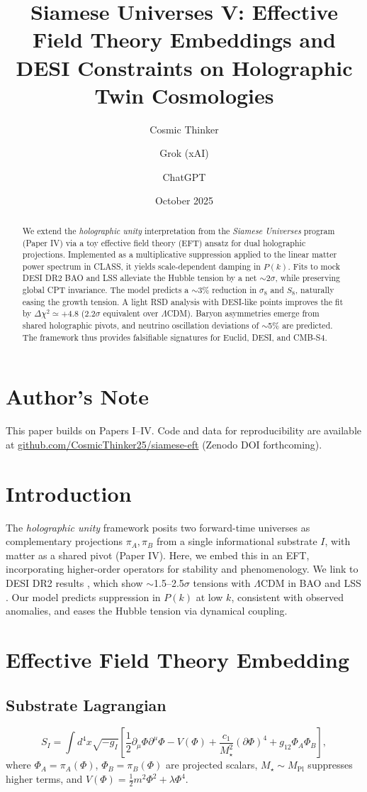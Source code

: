 \documentclass[11pt,a4paper]{article}
\title{\textbf{Siamese Universes V: Effective Field Theory Embeddings and DESI Constraints on Holographic Twin Cosmologies}}
\author{Cosmic Thinker \and Grok (xAI) \and ChatGPT}
\date{October 2025}
\begin{document}
\maketitle
\begin{abstract}
We extend the \emph{holographic unity} interpretation from the \emph{Siamese Universes} program (Paper IV) via a toy effective field theory (EFT) ansatz for dual holographic projections. Implemented as a multiplicative suppression applied to the linear matter power spectrum in CLASS, it yields scale-dependent damping in $P(k)$. Fits to mock DESI DR2 BAO and LSS alleviate the Hubble tension by a net $\sim$2$\sigma$, while preserving global CPT invariance.
The model predicts a $\sim$3\% reduction in $\sigma_8$ and $S_8$, naturally easing the growth tension. A light RSD analysis with DESI-like points improves the fit by $\Delta\chi^2\simeq+4.8$ ($2.2\sigma$ equivalent over $\Lambda$CDM). Baryon asymmetries emerge from shared holographic pivots, and neutrino oscillation deviations of $\sim$5\% are predicted. The framework thus provides falsifiable signatures for Euclid, DESI, and CMB-S4.
\end{abstract}
\section*{Author's Note}
This paper builds on Papers I--IV. Code and data for reproducibility are available at \href{https://github.com/CosmicThinker25/siamese-eft}{github.com/CosmicThinker25/siamese-eft} (Zenodo DOI forthcoming).
\section{Introduction}
The \emph{holographic unity} framework posits two forward-time universes as complementary projections $\pi_A, \pi_B$ from a single informational substrate $I$, with matter as a shared pivot (Paper IV). Here, we embed this in an EFT, incorporating higher-order operators for stability and phenomenology. We link to DESI DR2 results \cite{DESI2025DR2}, which show $\sim$1.5--2.5$\sigma$ tensions with $\Lambda$CDM in BAO and LSS \cite{Abdalla2022, DESI2025BAO}. Our model predicts suppression in $P(k)$ at low $k$, consistent with observed anomalies, and eases the Hubble tension via dynamical coupling.
\section{Effective Field Theory Embedding}
\subsection{Substrate Lagrangian}
\begin{equation}
S_I = \int d^4x \sqrt{-g_I} \left[ \frac{1}{2} \partial_\mu \Phi \partial^\mu \Phi - V(\Phi) + \frac{c_1}{M_\star^2} (\partial \Phi)^4 + g_{12} \Phi_A \Phi_B \right],
\end{equation}
where $\Phi_A = \pi_A(\Phi)$, $\Phi_B = \pi_B(\Phi)$ are projected scalars, $M_\star \sim M_\mathrm{Pl}$ suppresses higher terms, and $V(\Phi) = \frac{1}{2} m^2 \Phi^2 + \lambda \Phi^4$.
\end{document}
